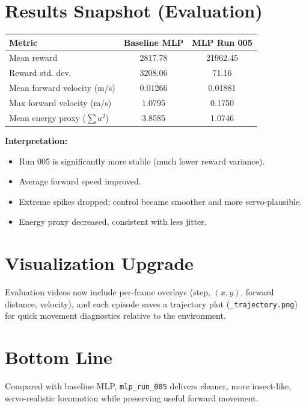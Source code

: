 \documentclass[10pt]{article}
\begin{document}
\section*{Results Snapshot (Evaluation)}
\begin{table}[h]
\centering
\begin{tabular}{lcc}
\toprule
Metric & Baseline MLP & MLP Run 005 \\
\midrule
Mean reward & 2817.78 & 21962.45 \\
Reward std. dev. & 3208.06 & 71.16 \\
Mean forward velocity (m/s) & 0.01266 & 0.01881 \\
Max forward velocity (m/s) & 1.0795 & 0.1750 \\
Mean energy proxy (\(\sum a^2\)) & 3.8585 & 1.0746 \\
\bottomrule
\end{tabular}
\end{table}

\textbf{Interpretation:}
\begin{itemize}
  \item Run 005 is significantly more stable (much lower reward variance).
  \item Average forward speed improved.
  \item Extreme spikes dropped; control became smoother and more servo-plausible.
  \item Energy proxy decreased, consistent with less jitter.
\end{itemize}

\section*{Visualization Upgrade}
Evaluation videos now include per-frame overlays (step, \((x,y)\), forward distance, velocity), and each episode saves a trajectory plot (\texttt{\_trajectory.png}) for quick movement diagnostics relative to the environment.

\section*{Bottom Line}
Compared with baseline MLP, \texttt{mlp\_run\_005} delivers cleaner, more insect-like, servo-realistic locomotion while preserving useful forward movement.
\end{document}
